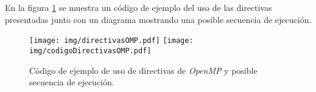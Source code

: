 En la figura \ref{directivas} se muestra un código de ejemplo del uso de las
directivas presentadas junto con un diagrama mostrando una posible secuencia
de ejecución.

\begin{figure}[!htb]

	\centering

	\texttt{[image: img/directivasOMP.pdf]}
	\texttt{[image: img/codigoDirectivasOMP.pdf]}

	\caption{Código de ejemplo de uso de directivas de \emph{OpenMP} y
	posible secuencia de ejecución.}

	\label{directivas}

\end{figure}
